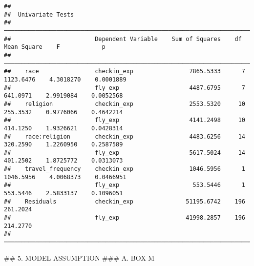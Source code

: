 \documentclass[
]{article}
\newenvironment{Shaded}{\begin{snugshade}}{\end{snugshade}}
\newcommand{\NormalTok}[1]{#1}
\newcommand{\SpecialCharTok}[1]{\textcolor[rgb]{0.00,0.00,0.00}{#1}}
\begin{document}
\begin{Shaded}
\end{Shaded}

\begin{verbatim}
## 
##  Univariate Tests                                                                                             
##  ──────────────────────────────────────────────────────────────────────────────────────────────────────────── 
##                        Dependent Variable    Sum of Squares    df     Mean Square    F            p           
##  ──────────────────────────────────────────────────────────────────────────────────────────────────────────── 
##    race                checkin_exp                7865.5333      7      1123.6476    4.3018270    0.0001889   
##                        fly_exp                    4487.6795      7       641.0971    2.9919084    0.0052568   
##    religion            checkin_exp                2553.5320     10       255.3532    0.9776066    0.4642214   
##                        fly_exp                    4141.2498     10       414.1250    1.9326621    0.0428314   
##    race:religion       checkin_exp                4483.6256     14       320.2590    1.2260950    0.2587589   
##                        fly_exp                    5617.5024     14       401.2502    1.8725772    0.0313073   
##    travel_frequency    checkin_exp                1046.5956      1      1046.5956    4.0068373    0.0466951   
##                        fly_exp                     553.5446      1       553.5446    2.5833137    0.1096051   
##    Residuals           checkin_exp               51195.6742    196       261.2024                             
##                        fly_exp                   41998.2857    196       214.2770                             
##  ────────────────────────────────────────────────────────────────────────────────────────────────────────────
\end{verbatim}

\hfill\break
\#\# 5. MODEL ASSUMPTION \#\#\# A. BOX M

\begin{Shaded}
\end{Shaded}
\end{document}
